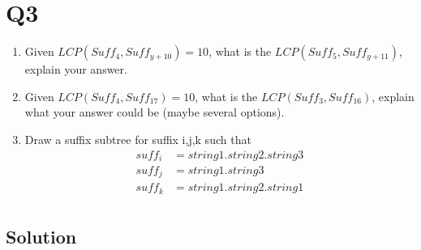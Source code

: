
\section*{Q3}

\begin{enumerate}
    \item Given $LCP(Suff_4, Suff_{y+10})=10$, what is the $LCP(Suff_5, Suff_{y+11})$, explain your answer.
    \item Given $LCP(Suff_4, Suff_{17})=10$, what is the $LCP(Suff_3, Suff_{16})$, explain what your answer could be (maybe several options).
    \item Draw a suffix subtree for suffix i,j,k such that
          \begin{align*}
              suff_i & =string1.string2.string3 \\
              suff_j & =string1.string3         \\
              suff_k & =string1.string2.string1 \\
          \end{align*}

\end{enumerate}

\subsection*{Solution}

